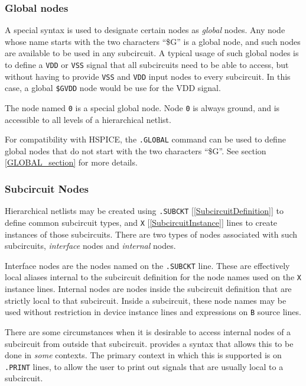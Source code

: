 \subsubsection{Global nodes}
A special syntax is used to designate certain nodes as {\em global}
nodes.  Any node whose name starts with the two characters ``\$G'' is
a global node, and such nodes are available to be used in any
subcircuit.  A typical usage of such global nodes is to define a \texttt{VDD}
or \texttt{VSS} signal that all subcircuits need to be able to access, but
without having to provide \texttt{VSS} and \texttt{VDD} input
nodes to every subcircuit.  In this case, a global \texttt{\$GVDD} node
would be use for the VDD signal.

The node named \texttt{0} is a special global node.  Node \texttt{0}
is always ground, and is accessible to all levels of a hierarchical
netlist.

For compatibility with HSPICE, the \texttt{.GLOBAL} command can
be used to define global nodes that do not start with the two
characters ``\$G''.  See section \ref{GLOBAL_section} for more details.

\subsubsection{Subcircuit Nodes}

Hierarchical netlists may be created using
\texttt{.SUBCKT} [\ref{SubcircuitDefinition}] to define common subcircuit
types, and \texttt{X} [\ref{SubcircuitInstance}] lines to create
instances of those subcircuits.  There are two types of nodes
associated with such subcircuits, {\em interface\/} nodes and {\em
internal\/} nodes.

Interface nodes are the nodes named on the \texttt{.SUBCKT} line.
These are effectively local aliases internal to the subcircuit
definition for the node names used on the \texttt{X} instance lines.
Internal nodes are nodes inside the subcircuit definition that are
strictly local to that subcircuit.  Inside a subcircuit, these node
names may be used without restriction in device instance lines and
expressions on \texttt{B} source lines.

There are some circumstances when it is desirable to access internal
nodes of a subcircuit from outside that subcircuit.  \Xyce{} provides a
syntax that allows this to be done in {\em some\/} contexts.  The
primary context in which this is supported is on \texttt{.PRINT}
lines, to allow the user to print out signals that are usually local
to a subcircuit.

